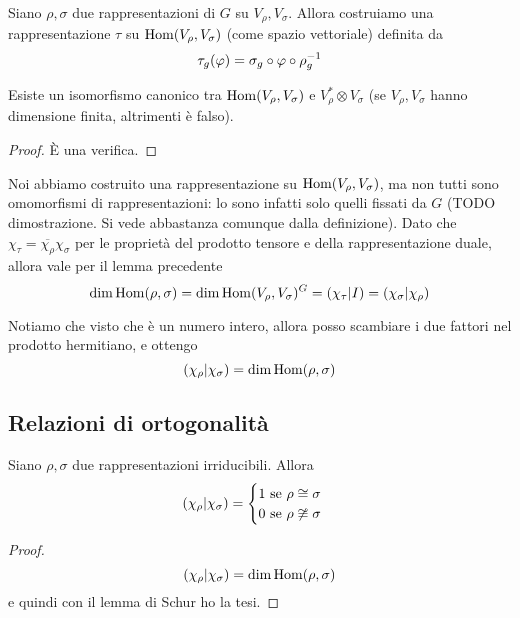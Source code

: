 \documentclass[a4paper,10pt,oneside]{math_article}
\renewcommand{\phi}{\varphi}
\newcommand{\herm}[2]{\left(#1 | #2\right)}
\newcommand{\id}{I}
\newcommand{\tensor}{\otimes}
\let\conj\overline
\begin{document}
    \begin{mydef}
     Siano $\rho, \sigma$ due rappresentazioni di $G$ su $V_\rho,V_\sigma$. Allora costruiamo una rappresentazione $\tau$ su $\operatorname{Hom}(V_\rho,V_\sigma)$ (come spazio vettoriale) definita da 
     \[
      \tau_g (\phi) = \sigma_g \circ \phi \circ \rho_g\inv
     \]
    \end{mydef}
    
    \begin{myprop}
     Esiste un isomorfismo canonico tra $\operatorname{Hom} (V_\rho,V_\sigma)$ e $V_\rho^* \tensor V_\sigma$ (se $V_\rho, V_\sigma$ hanno dimensione finita, altrimenti è falso).
    \end{myprop}
    
    \begin{proof}
     \`E una verifica.
    \end{proof}
    
    Noi abbiamo costruito una rappresentazione su $\operatorname{Hom}(V_\rho,V_\sigma)$, ma non tutti sono omomorfismi di rappresentazioni: lo sono infatti solo quelli fissati da $G$ (TODO dimostrazione. Si vede abbastanza comunque dalla definizione). Dato che $\chi_\tau = \conj{\chi_\rho}\chi_\sigma$ per le proprietà del prodotto tensore e della rappresentazione duale, allora vale per il lemma precedente
    \[
     \dim \Hom(\rho,\sigma) = \dim \Hom(V_\rho,V_\sigma)^G = \herm {\chi_\tau}\id = \herm{\chi_\sigma}{\chi_\rho}
    \]
    
    Notiamo che visto che è un numero intero, allora posso scambiare i due fattori nel prodotto hermitiano, e ottengo
    \[
     \herm{\chi_\rho}{\chi_\sigma} = \dim \Hom(\rho,\sigma)
    \]


    
    



   \subsection{Relazioni di ortogonalità}
    \begin{mytheorem}
     Siano $\rho,\sigma$ due rappresentazioni irriducibili. Allora
     \[
      \herm {\chi_\rho} {\chi_\sigma} = \begin{cases}
                           1 \mbox{ se } \rho \isom \sigma \\
                           0 \mbox{ se } \rho \not\isom \sigma
                          \end{cases}
     \]
    \end{mytheorem}
    \begin{proof}
     \[
      \herm {\chi_\rho}{\chi_\sigma}=\dim \Hom(\rho,\sigma)
     \]
     e quindi con il lemma di Schur ho la tesi.
    \end{proof}
    
\end{document}
